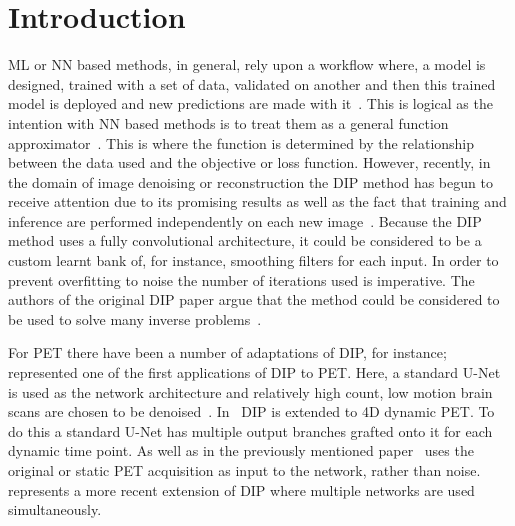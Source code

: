 \section{Introduction} \label{sec:introduction}
     \gls{ML} or \gls{NN} based methods, in general, rely upon a workflow where, a model is designed, trained with a set of data, validated on another and then this trained model is deployed and new predictions are made with it~\cite{Krose2011AnNetworks}. This is logical as the intention with \gls{NN} based methods is to treat them as a general function approximator~\cite{Krose2011AnNetworks}. This is where the function is determined by the relationship between the data used and the objective or loss function. However, recently, in the domain of image denoising or reconstruction the \gls{DIP} method has begun to receive attention due to its promising results as well as the fact that training and inference are performed independently on each new image~\cite{Ulyanov2018DeepPrior}. Because the \gls{DIP} method uses a fully convolutional architecture, it could be considered to be a custom learnt bank of, for instance, smoothing filters for each input. In order to prevent overfitting to noise the number of iterations used is imperative. The authors of the original \gls{DIP} paper argue that the method could be considered to be used to solve many inverse problems~\cite{Ulyanov2018DeepPrior}.
    
    For \gls{PET} there have been a number of adaptations of \gls{DIP}, for instance;~\cite{Gong2019PETPrior} represented one of the first applications of \gls{DIP} to \gls{PET}. Here, a standard U-Net is used as the network architecture and relatively high count, low motion brain scans are chosen to be denoised~\cite{Weng2015U-Net:Segmentation}. In~\cite{Hashimoto20214DNetwork} \gls{DIP} is extended to \gls{4D} dynamic \gls{PET}. To do this a standard U-Net has multiple output branches grafted onto it for each dynamic time point. As well as in the previously mentioned paper~\cite{Hashimoto2019DynamicDatasets} uses the original or static \gls{PET} acquisition as input to the network, rather than noise.~\cite{Yang2022SimultaneousPrior} represents a more recent extension of \gls{DIP} where multiple networks are used simultaneously.
    
